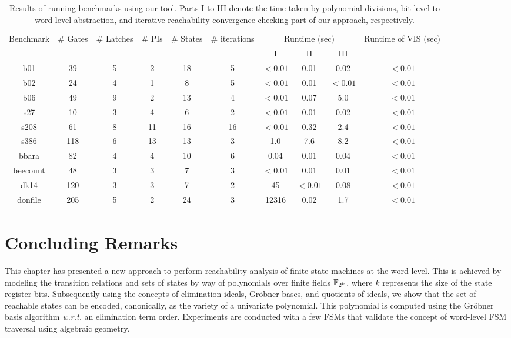 \begin{table}[tbp]
\centering
\caption{Results of running benchmarks using our tool. 
Parts I to III denote the time taken by polynomial divisions,
  bit-level to word-level abstraction, and iterative reachability
  convergence checking part of our approach, respectively.}
{\small 
\begin{tabular}{|c||c|c|c|c|c|c|c|c|c|}
\hline
\multirow{3}{*}{\centering Benchmark} 
& \multirow{3}{0.9cm}{\centering \# Gates} 
& \multirow{3}{1.1cm}{\centering \# Latches} 
& \multirow{3}{*}{\centering \# PIs}
 & \multirow{3}{0.9cm}{\centering \# States}
 & \multirow{3}{1.2cm}{\centering \# iterations}
 & \multicolumn{3}{c|}{\multirow{2}{2.0cm}{\centering Runtime (sec)}}
 & \multirow{3}{1.3cm}{\centering Runtime of VIS (sec)} \\
  & & & & & &\multicolumn{3}{c|}{}& \\
  \cline{7-9}
    & & & & & & I & II & III & \\
\hline
\hline
b01 & 39  & 5  & 2 & 18  & 5  & $<0.01$ & 0.01 & 0.02 & $<0.01$\\
b02 & 24  & 4  & 1 & 8 & 5 & $<0.01$  & 0.01 & $<0.01$ & $<0.01$ \\
b06 & 49  & 9  & 2 & 13 & 4 & $<0.01$ & 0.07 & 5.0 & $<0.01$ \\
s27 & 10 & 3 & 4 & 6 & 2 & $<0.01$ & 0.01 & 0.02  & $<0.01$  \\
s208 & 61 & 8 & 11 & 16 & 16 & $<0.01$ & 0.32 & 2.4 & $<0.01$ \\
s386 & 118 & 6 & 13 & 13  & 3 & 1.0 & 7.6 & 8.2  & $<0.01$ \\
bbara & 82 & 4 & 4 & 10 & 6 & 0.04 & 0.01 & 0.04  & $<0.01$ \\
beecount & 48  & 3  & 3 & 7  & 3  &$<0.01$ & 0.01 & 0.01 & $<0.01$ \\
dk14 & 120  & 3  & 3 & 7  & 2  & 45 & $<0.01$ & 0.08 & $<0.01$\\
donfile & 205  & 5  & 2 & 24 & 3  & 12316 & 0.02 & 1.7  & $<0.01$\\
\hline
\end{tabular}
}
\label{tab:recha_result}  
\end{table} 

\section{Concluding Remarks}
This chapter has presented a new approach to perform reachability
analysis of finite state machines at the word-level. This is achieved
by modeling the transition relations and sets of states by way of
polynomials over finite fields ${\mathbb{F}}_{2^k}$, where $k$ represents the size
of the state register bits. Subsequently using the concepts of
elimination ideals, Gr\"obner bases, and quotients of ideals, we show
that the set of reachable states can be encoded, canonically, as the
variety of a univariate polynomial. This polynomial is computed using
the Gr\"obner basis algorithm {\it w.r.t.} an elimination term
order. Experiments are conducted with a few FSMs that validate the
concept of word-level FSM traversal using algebraic geometry. 
